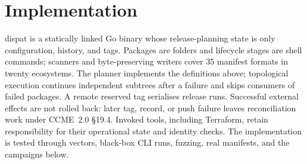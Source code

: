 \documentclass[sigconf,nonacm]{acmart}
\begin{document}
\begin{table}[t]
\caption{Pinned release-tool configurations.}
\label{tab:compare}
\scriptsize
{}
\end{table}

\section{Implementation}
\label{sec:impl}

dispat is a statically linked Go binary whose release-planning state is only
configuration, history, and tags. Packages are folders and lifecycle stages
are shell commands; scanners and byte-preserving writers cover 35 manifest
formats in twenty ecosystems. The planner implements the definitions above;
topological execution continues independent subtrees after a failure and
skips consumers of failed packages. A remote reserved tag serialises release
runs. Successful external effects are not rolled back: later tag, record, or
push failure leaves reconciliation work under CCME~2.0 \S19.4. Invoked tools,
including Terraform, retain responsibility for their operational state and
identity checks. The implementation is tested through vectors, black-box CLI
runs, fuzzing, real manifests, and the campaigns below.
\end{document}
